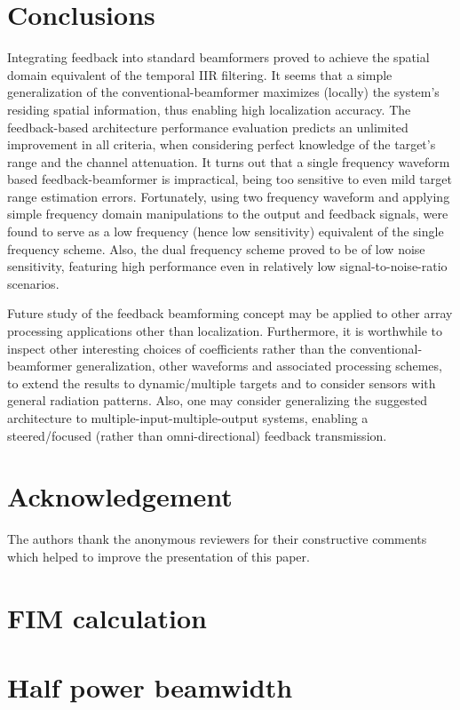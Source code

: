 \documentclass[journal]{IEEEtran}
\begin{document}
\section{Conclusions}
\label{sec_conclusions}
Integrating feedback into standard beamformers proved to achieve the spatial domain equivalent of the temporal IIR filtering.
It seems that a simple generalization of the conventional-beamformer maximizes (locally) the system's residing spatial information, thus enabling high localization accuracy.
The feedback-based architecture performance evaluation predicts an unlimited improvement in all criteria, when considering perfect knowledge of the target's range and the channel attenuation.
It turns out that a single frequency waveform based feedback-beamformer is impractical, being too sensitive to even mild target range estimation errors.
Fortunately, using two frequency waveform and applying simple frequency domain manipulations to the output and feedback signals, were found to serve as a low frequency (hence low sensitivity) equivalent of the single frequency scheme.
Also, the dual frequency scheme proved to be of low noise sensitivity, featuring high performance even in relatively low signal-to-noise-ratio scenarios.
\par Future study of the feedback beamforming concept may be applied to other array processing applications other than localization.
Furthermore, it is worthwhile to inspect other interesting choices of coefficients rather than the conventional-beamformer generalization, other waveforms and associated processing schemes, to extend the results to dynamic/multiple targets and to consider sensors with general radiation patterns.
Also, one may consider generalizing the suggested architecture to multiple-input-multiple-output systems, enabling a steered/focused (rather than omni-directional) feedback transmission.

\section*{Acknowledgement}
The authors thank the anonymous reviewers for their constructive comments which helped to improve the presentation of this paper.

\appendices
\section{FIM calculation}
\label{apdx_clacFim}

\section{Half power beamwidth}
\label{apdx_HPBW}

\end{document}
